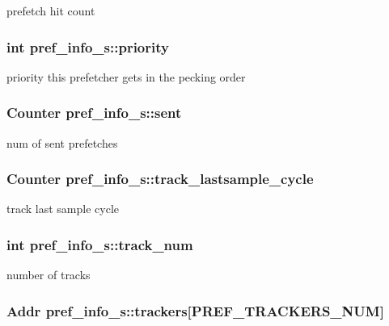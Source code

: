 \label{structpref__info__s_a84a8db7783a6a9ae781fc5e5ee66b9da}
prefetch hit count \hypertarget{structpref__info__s_ad62caa3f68f6e5919b28dc207c46dfab}{
\subsubsection[{priority}]{\setlength{\rightskip}{0pt plus 5cm}int {\bf pref\_\-info\_\-s::priority}}}
\label{structpref__info__s_ad62caa3f68f6e5919b28dc207c46dfab}
priority this prefetcher gets in the pecking order \hypertarget{structpref__info__s_a5c781e0f70693480da17b433e11d0132}{
\subsubsection[{sent}]{\setlength{\rightskip}{0pt plus 5cm}Counter {\bf pref\_\-info\_\-s::sent}}}
\label{structpref__info__s_a5c781e0f70693480da17b433e11d0132}
num of sent prefetches \hypertarget{structpref__info__s_a1151a69f70f1518d9223e15d91479300}{
\subsubsection[{track\_\-lastsample\_\-cycle}]{\setlength{\rightskip}{0pt plus 5cm}Counter {\bf pref\_\-info\_\-s::track\_\-lastsample\_\-cycle}}}
\label{structpref__info__s_a1151a69f70f1518d9223e15d91479300}
track last sample cycle \hypertarget{structpref__info__s_a0c42749d820824d50ada89d498523f29}{
\subsubsection[{track\_\-num}]{\setlength{\rightskip}{0pt plus 5cm}int {\bf pref\_\-info\_\-s::track\_\-num}}}
\label{structpref__info__s_a0c42749d820824d50ada89d498523f29}
number of tracks \hypertarget{structpref__info__s_a98609e4e7376f3fae20054c99feee11a}{
\subsubsection[{trackers}]{\setlength{\rightskip}{0pt plus 5cm}Addr {\bf pref\_\-info\_\-s::trackers}\mbox{[}PREF\_\-TRACKERS\_\-NUM\mbox{]}}}
